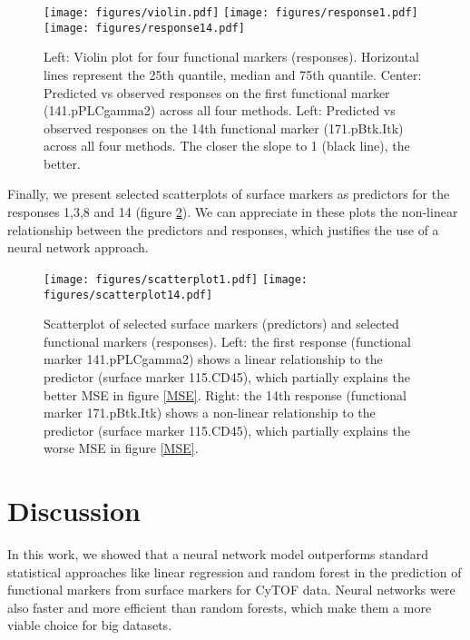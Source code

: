 \documentclass[graybox]{svmult}
\begin{document}
\begin{figure}
\centering
\texttt{[image: figures/violin.pdf]} \hspace{0.25cm}
\texttt{[image: figures/response1.pdf]}
\hspace{0.25cm}
\texttt{[image: figures/response14.pdf]}
\caption{Left: Violin plot for four functional markers (responses). Horizontal lines represent the 25th quantile, median and 75th quantile. Center: Predicted vs observed responses on the first functional marker (141.pPLCgamma2)
  across all four methods. Left: Predicted vs observed responses on the 14th functional marker (171.pBtk.Itk)
  across all four methods. The closer the slope to 1 (black line), the
  better.}
\label{violin}
\end{figure}

Finally, we present selected scatterplots of surface markers as predictors for the responses 1,3,8 and 14 (figure
\ref{predObs}). We can appreciate in these plots the non-linear relationship between the predictors and responses, which justifies the use of a neural network approach.

\begin{figure}
\centering
\texttt{[image: figures/scatterplot1.pdf]} \hspace{0.5cm}
\texttt{[image: figures/scatterplot14.pdf]}
\caption{Scatterplot of selected surface markers (predictors) and selected functional markers (responses). Left: the first response (functional marker 141.pPLCgamma2) shows a linear relationship to the predictor (surface marker 115.CD45), which partially explains the better MSE in figure \ref{MSE}. Right: the 14th response (functional marker 171.pBtk.Itk) shows a non-linear relationship to the predictor (surface marker 115.CD45), which partially explains the worse MSE in figure \ref{MSE}.}
\label{predObs}
\end{figure}



\section{Discussion}

In this work, we showed that a neural network model outperforms
standard statistical approaches like linear regression and random
forest in the prediction of functional markers from surface markers
for CyTOF data. Neural networks were also faster and more efficient
than random forests, which make them a more viable choice for big
datasets.
\end{document}
